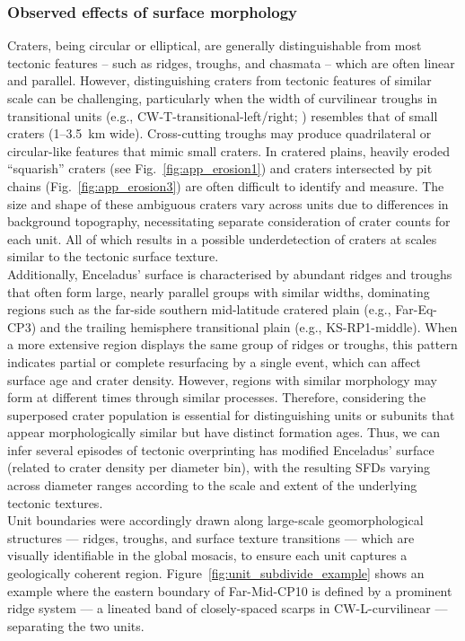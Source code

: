 \documentclass[preprint,11pt,3p,times,authoryear]{elsarticle}
\begin{document}
\subsubsection{Observed effects of surface morphology}
\label{subsec:geomorphology}
Craters, being circular or elliptical, are generally distinguishable from most tectonic features -- such as ridges, troughs, and chasmata -- which are often linear and parallel. However, distinguishing craters from tectonic features of similar scale can be challenging, particularly when the width of curvilinear troughs in transitional units (e.g., CW-T-transitional-left/right; \citet{CrowWillard2015}) resembles that of small craters (1–3.5~km wide). Cross-cutting troughs may produce quadrilateral or circular-like features that mimic small craters. In cratered plains, heavily eroded ``squarish'' craters (see Fig.~\ref{fig:app_erosion1}) and craters intersected by pit chains (Fig.~\ref{fig:app_erosion3}) are often difficult to identify and measure. The size and shape of these ambiguous craters vary across units due to differences in background topography, necessitating separate consideration of crater counts for each unit. All of which results in a possible underdetection of craters at scales similar to the tectonic surface texture. \\

Additionally, Enceladus’ surface is characterised by abundant ridges and troughs that often form large, nearly parallel groups with similar widths, dominating regions such as the far-side southern mid-latitude cratered plain (e.g., Far-Eq-CP3) and the trailing hemisphere transitional plain (e.g., KS-RP1-middle). When a more extensive region displays the same group of ridges or troughs, this pattern indicates partial or complete resurfacing by a single event, which can affect surface age and crater density. However, regions with similar morphology may form at different times through similar processes. Therefore, considering the superposed crater population is essential for distinguishing units or subunits that appear morphologically similar but have distinct formation ages. Thus, we can infer several episodes of tectonic overprinting has modified Enceladus' surface (related to crater density per diameter bin), with the resulting SFDs varying across diameter ranges according to the scale and extent of the underlying tectonic textures. \\

Unit boundaries were accordingly drawn along large-scale geomorphological structures --- ridges, troughs, and surface texture transitions --- which are visually identifiable in the global mosacis, to ensure each unit captures a geologically coherent region. 
Figure~\ref{fig:unit_subdivide_example} shows an example where the eastern boundary of Far-Mid-CP10 is defined by a prominent ridge system — a lineated band of closely-spaced scarps in CW-L-curvilinear — separating the two units.\\
\end{document}
